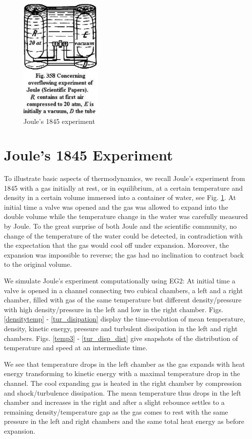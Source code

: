 \begin{figure}[bhpt]
\centerline{
 \includegraphics[height=6cm]{chapters/hoffman-3/pdf/fig358.pdf}
}
\caption{Joule's 1845 experiment}
\label{joule}
\end{figure}


\section{Joule's 1845 Experiment}

To illustrate basic aspects of thermodynamics,
we recall Joule's experiment from 1845 with a gas initially
at rest, or in equilibrium, at a certain temperature and density
in a certain volume immersed into a container of water, see
Fig. \ref{joule}. At initial time a valve was opened and the
gas was allowed to expand into the double volume while the temperature
change in the water was carefully measured by Joule.
To the great surprise of both Joule and the scientific community, no change
of the temperature of the water could be detected, in contradiction with
the expectation that the gas would cool off under expansion.
Moreover, the expansion was impossible to reverse; the gas had no inclination
to contract back to the original volume.

We simulate Joule's experiment computationally using EG2: At initial time a
valve is opened in a channel connecting
two cubical chambers, a left and a right chamber, filled with gas of the same
temperature but different
density/pressure with high density/pressure in the left and low in the right
chamber.
Figs. \ref{densitytemp} - \ref{tur_disipation} display the time-evolution of
mean temperature, density, kinetic
energy, pressure and turbulent dissipation in the left and right chambers. Figs.
\ref{temp3} - \ref{tur_disp_dist} give snapshots of the distribution of
temperature and speed at an intermediate time.

We see that temperature drops in the left chamber as the gas expands with heat
energy transforming to kinetic energy
with a maximal temperature drop in the channel. The cool expanding gas is
heated  in the right chamber by compression and shock/turbulence dissipation.
The mean temperature thus drops in the left chamber and
increases in the right and
after a slight rebounce settles to a remaining density/temperature gap as the
gas comes to rest with the same pressure
in the left and right chambers and the same total heat energy as before
expansion.

